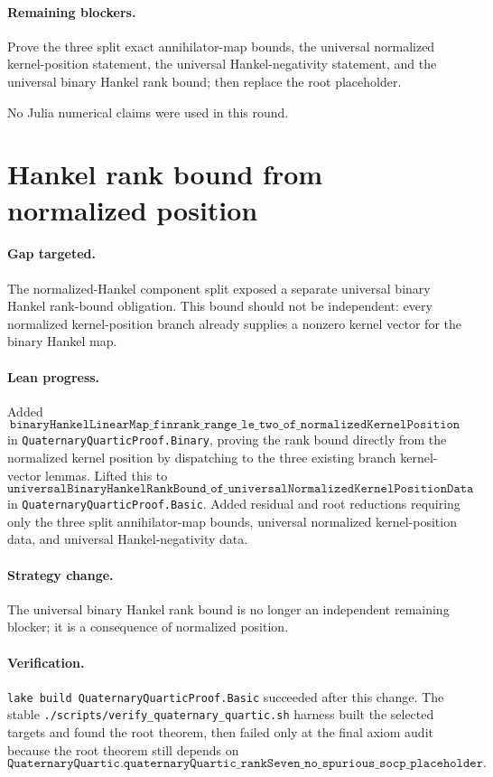 \documentclass[11pt]{article}
\begin{document}
\paragraph{Remaining blockers.}
Prove the three split exact annihilator-map bounds, the universal normalized
kernel-position statement, the universal Hankel-negativity statement, and the
universal binary Hankel rank bound; then replace the root placeholder.

No Julia numerical claims were used in this round.

\section*{Hankel rank bound from normalized position}

\paragraph{Gap targeted.}
The normalized-Hankel component split exposed a separate universal binary
Hankel rank-bound obligation.  This bound should not be independent: every
normalized kernel-position branch already supplies a nonzero kernel vector for
the binary Hankel map.

\paragraph{Lean progress.}
Added
\[
\texttt{binaryHankelLinearMap\_finrank\_range\_le\_two\_of\_normalizedKernelPosition}
\]
in \texttt{QuaternaryQuarticProof.Binary}, proving the rank bound directly from
the normalized kernel position by dispatching to the three existing branch
kernel-vector lemmas.  Lifted this to
\[
\texttt{universalBinaryHankelRankBound\_of\_universalNormalizedKernelPositionData}
\]
in \texttt{QuaternaryQuarticProof.Basic}.  Added residual and root reductions
requiring only the three split annihilator-map bounds, universal normalized
kernel-position data, and universal Hankel-negativity data.

\paragraph{Strategy change.}
The universal binary Hankel rank bound is no longer an independent remaining
blocker; it is a consequence of normalized position.

\paragraph{Verification.}
\texttt{lake build QuaternaryQuarticProof.Basic} succeeded after this change.
The stable \texttt{./scripts/verify\_quaternary\_quartic.sh} harness built the
selected targets and found the root theorem, then failed only at the final axiom
audit because the root theorem still depends on
\[
\texttt{QuaternaryQuartic.quaternaryQuartic\_rankSeven\_no\_spurious\_socp\_placeholder}.
\]
\end{document}
